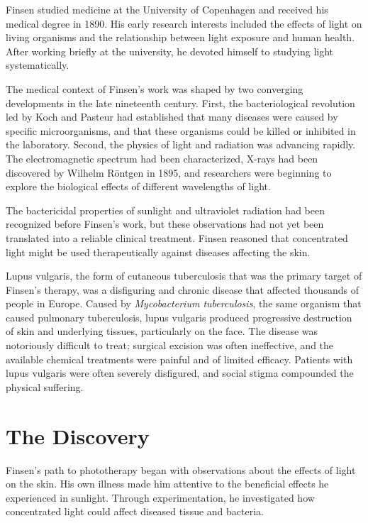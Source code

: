 Finsen studied medicine at the University of Copenhagen and received his medical degree in 1890. His early research interests included the effects of light on living organisms and the relationship between light exposure and human health. After working briefly at the university, he devoted himself to studying light systematically.

The medical context of Finsen's work was shaped by two converging developments in the late nineteenth century. First, the bacteriological revolution led by Koch and Pasteur had established that many diseases were caused by specific microorganisms, and that these organisms could be killed or inhibited in the laboratory. Second, the physics of light and radiation was advancing rapidly. The electromagnetic spectrum had been characterized, X-rays had been discovered by Wilhelm Röntgen in 1895, and researchers were beginning to explore the biological effects of different wavelengths of light.

The bactericidal properties of sunlight and ultraviolet radiation had been recognized before Finsen's work, but these observations had not yet been translated into a reliable clinical treatment. Finsen reasoned that concentrated light might be used therapeutically against diseases affecting the skin.\cite{finsen-history}

Lupus vulgaris, the form of cutaneous tuberculosis that was the primary target of Finsen's therapy, was a disfiguring and chronic disease that affected thousands of people in Europe. Caused by \emph{Mycobacterium tuberculosis}, the same organism that caused pulmonary tuberculosis, lupus vulgaris produced progressive destruction of skin and underlying tissues, particularly on the face. The disease was notoriously difficult to treat; surgical excision was often ineffective, and the available chemical treatments were painful and of limited efficacy. Patients with lupus vulgaris were often severely disfigured, and social stigma compounded the physical suffering.

\section{The Discovery}

Finsen's path to phototherapy began with observations about the effects of light on the skin. His own illness made him attentive to the beneficial effects he experienced in sunlight. Through experimentation, he investigated how concentrated light could affect diseased tissue and bacteria.

